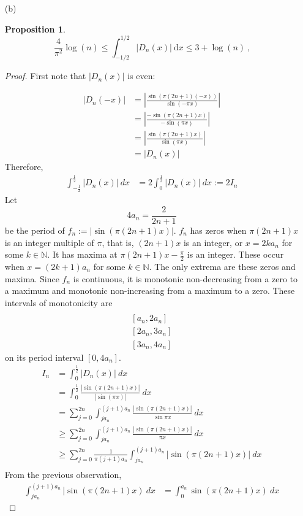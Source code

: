 \documentclass[12pt, reqno]{amsart}
\newtheorem{prop}{Proposition}[section]
\theoremstyle{definition}
\theoremstyle{remark}
\newcommand{\ud}{\mathrm{d}}
\begin{document}
\begin{itemize}
\begin{itemize}
\vspace{0.1 cm}
\item[(b)]

\begin{prop}
   \begin{equation} 
      \frac{4}{\pi^2} \log(n) \leq \int_{-1/2}^{1/2} \vert D_n(x) \vert ~\ud x \leq 3 + \log(n) ~\mbox{,}
      \end{equation}
   
\end{prop}

\begin{proof}
   First note that $|D_{n}(x)|$ is even:

\begin{align*}
|D_{n}(-x)|&= \left|\frac{\sin(\pi(2n+1)(-x))}{\sin(-\pi x)}\right|\\
&= \left|\frac{-\sin(\pi(2n+1)x)}{-\sin(\pi x)}\right|\\
&= \left|\frac{\sin (\pi(2n+1)x)}{\sin(\pi x)}\right|\\
&= |D_{n}(x)|
\end{align*}Therefore, \begin{align*}
\int_{- \frac{1}{2}}^{\frac{1}{2}}|D_{n}(x)|\ dx&= 2\int_{0}^{\frac{1}{2}}\left|D_{n}(x)\right|\ dx:=2I_{n}
\end{align*}
Let $$4a_{n}= \frac{2}{2n+1}$$be the period of $f_{n}:=|\sin(\pi(2n+1)x)|$. $f_n$ has zeros when $\pi(2n+1)x$ is an integer multiple of $\pi$, that is, $(2n+1)x$ is an integer, or $x=2ka_n$ for some $k\in \mathbb{N}$. It has maxima at $\pi(2n+1)x- \frac{\pi}{2}$ is an integer. These occur when $x=(2k+1)a_n$ for some $k\in \mathbb{N}$. The only extrema are these zeros and maxima. Since $f_{n}$ is continuous, it is monotonic non-decreasing from a zero to a maximum and monotonic non-increasing from a maximum to a zero. These intervals of monotonicity are \begin{align*}
[0,a_{n}]\\
[a_{n},2a_{n}]\\
[2a_{n},3a_{n}]\\
[3a_{n},4a_{n}]
\end{align*}on its period interval $[0,4a_n ]$. 
\begin{align*}
I_{n}&= \int_{0}^{\frac{1}{2}}|D_{n}(x)|\ dx\\
&= \int_{0}^{\frac{1}{2}}\frac{|\sin (\pi(2n+1)x)|}{|\sin(\pi x)|}\ dx\\
&= \sum_{j=0}^{2n}\int_{ja_{n}}^{(j+1)a_{n}} \frac{|\sin(\pi(2n+1)x)|}{\sin \pi x}\ dx\\
&\ge \sum_{j=0}^{2n}\int_{ja_{n}}^{(j+1)a_{n}} \frac{|\sin(\pi(2n+1)x)|}{\pi x}\ dx\\
&\ge \sum_{j=0}^{2n} \frac{1}{\pi(j+1)a_{n}}\int_{ja_{n}}^{(j+1)a_{n}} |\sin(\pi(2n+1)x)|\ dx\\
\end{align*}
From the previous observation, \begin{align*}
\int_{ja_{n}}^{(j+1)a_{n}}|\sin(\pi(2n+1)x)\ dx&= \int_{0}^{a_{n}}\sin(\pi(2n+1)x)\ dx
\end{align*}


\end{proof}
\end{itemize}
\end{itemize}
\end{document}

